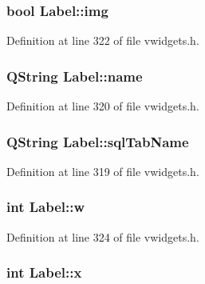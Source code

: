 \hypertarget{classLabel_a41e67ddc798145020945bf373032788d}{
\subsubsection[{img}]{\setlength{\rightskip}{0pt plus 5cm}bool {\bf Label::img}}}
\label{classLabel_a41e67ddc798145020945bf373032788d}


Definition at line 322 of file vwidgets.h.

\hypertarget{classLabel_a9456abb423939d68c1671b796abf92d8}{
\subsubsection[{name}]{\setlength{\rightskip}{0pt plus 5cm}QString {\bf Label::name}}}
\label{classLabel_a9456abb423939d68c1671b796abf92d8}


Definition at line 320 of file vwidgets.h.

\hypertarget{classLabel_a5584bf11b1059f5c48ee4ed0e074e5b3}{
\subsubsection[{sqlTabName}]{\setlength{\rightskip}{0pt plus 5cm}QString {\bf Label::sqlTabName}}}
\label{classLabel_a5584bf11b1059f5c48ee4ed0e074e5b3}


Definition at line 319 of file vwidgets.h.

\hypertarget{classLabel_ac1b8873ac4b399c5f70305b08aa7f5c8}{
\subsubsection[{w}]{\setlength{\rightskip}{0pt plus 5cm}int {\bf Label::w}}}
\label{classLabel_ac1b8873ac4b399c5f70305b08aa7f5c8}


Definition at line 324 of file vwidgets.h.

\hypertarget{classLabel_a8339b81ceaa1dab691f57cea88886e86}{
\subsubsection[{x}]{\setlength{\rightskip}{0pt plus 5cm}int {\bf Label::x}}}
\label{classLabel_a8339b81ceaa1dab691f57cea88886e86}


